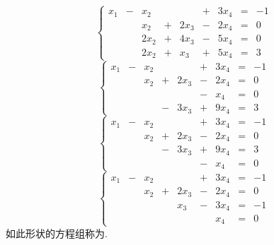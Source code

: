 \begin{frame}
\begin{jie}
  $$
  \left\{
    \begin{array}{rcrcrcrcrr}
      x_1 & - &  x_2 &   &      & + &  3x_4 & = &-1 \\[0.1cm]
          &  &  x_2 & + & 2x_3 & - &  2x_4 & = &0 \\[0.1cm]
          &  & 2x_2 & + & 4x_3 & - &  5x_4 & = &0 \\[0.1cm]
          &  & 2x_2 & + &  x_3 & + &  5x_4 & = &3 
    \end{array}
  \right.
  $$    
  $$
  \left\{
    \begin{array}{rcrcrcrcrr}
      x_1 & - &  x_2 &   &      & + &  3x_4 & = &-1 \\[0.1cm]
          &  &  x_2 & + & 2x_3 & - &  2x_4 & = &0 \\[0.1cm]
          &  &  &  &  & - &  x_4 & = &0 \\[0.1cm]
          &  &  & - &  3x_3 & + &  9x_4 & = &3 
    \end{array}
  \right.
  $$    
  $$
  \left\{
    \begin{array}{rcrcrcrcrr}
      x_1 & - &  x_2 &   &      & + &  3x_4 & = &-1 \\[0.1cm]
          &  &  x_2 & + & 2x_3 & - &  2x_4 & = &0 \\[0.1cm]
          &  &  & - &  3x_3 & + &  9x_4 & = &3 \\[0.1cm]
          &  &  &  &  & - &  x_4 & = &0 
    \end{array}
  \right.
  $$    
  $$
  \left\{
    \begin{array}{rcrcrcrcrr}
      x_1 & - &  x_2 &   &      & + &  3x_4 & = &-1 \\[0.1cm]
          &  &  x_2 & + & 2x_3 & - &  2x_4 & = &0 \\[0.1cm]
          &  &  &  &  x_3 & - &  3x_4 & = &-1 \\[0.1cm]
          &  &  &  &  &  &  x_4 & = &0 
    \end{array}
  \right.
  $$    
  如此形状的方程组称为.
 \end{jie}
\end{frame}

